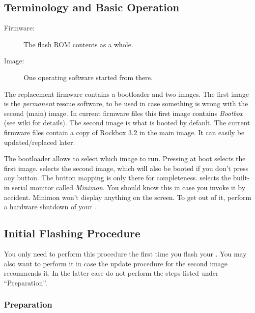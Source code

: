 \subsection{Terminology and Basic Operation}

\begin{description}
\item[Firmware:] The flash ROM contents as a whole.
\item[Image:] One operating software started from there.
\end{description}

The replacement firmware contains a bootloader and two images. The first image
is the \emph{permanent} rescue software, to be used in case something is wrong
with the second (main) image. In current firmware files this first image
contains \emph{Bootbox} (see wiki for details). The second image is what is
booted by default. The current firmware files contain a copy of Rockbox 3.2
in the main image. It can easily be updated/replaced later.

The bootloader allows to select which image to run. Pressing
 at boot
selects the first image.
selects the second image, which will also be booted if you don't press any
button. The button mapping is only there for completeness.
selects the built-in serial monitor called \emph{Minimon}. You should know this
in case you invoke it by accident. Minimon won't display anything on the
screen. To get out of it, perform a hardware shutdown of your \dap.

\subsection{Initial Flashing Procedure}

You only need to perform this procedure the first time you flash your
\playertype. You may also want to perform it in case the update procedure for
the second image recommends it. In the latter case do not perform the steps
listed under ``Preparation''.

\subsubsection{Preparation}


